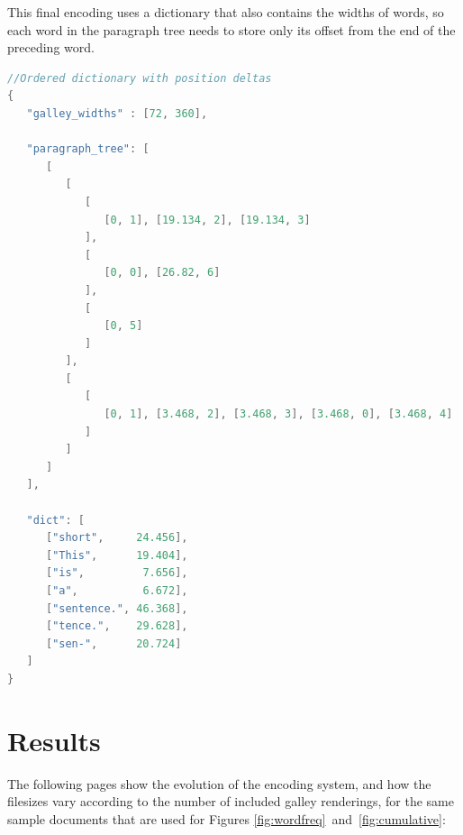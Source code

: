 \clearpage

This final encoding uses a dictionary that also contains the widths of words, so each word in the paragraph tree needs to store only its offset from the end of the preceding word.

\vspace{0.5in}
\begin{lstlisting}[language=c,stringstyle=\color{blue},basicstyle=\ttfamily\footnotesize\singlespacing]
//Ordered dictionary with position deltas
{
   "galley_widths" : [72, 360],

   "paragraph_tree": [
      [
         [
            [
               [0, 1], [19.134, 2], [19.134, 3]
            ],
            [
               [0, 0], [26.82, 6]
            ],
            [
               [0, 5]
            ]
         ],
         [
            [
               [0, 1], [3.468, 2], [3.468, 3], [3.468, 0], [3.468, 4]
            ]
         ]
      ]
   ],

   "dict": [
      ["short",     24.456],
      ["This",      19.404],
      ["is",         7.656],
      ["a",          6.672],
      ["sentence.", 46.368],
      ["tence.",    29.628],
      ["sen-",      20.724]
   ]
}
\end{lstlisting}


\clearpage
\section{Results}

The following pages show the evolution of the encoding system, and how the filesizes vary according to the number of included galley renderings, for the same sample documents that are used for Figures \ref{fig:wordfreq}~and~\ref{fig:cumulative}:

